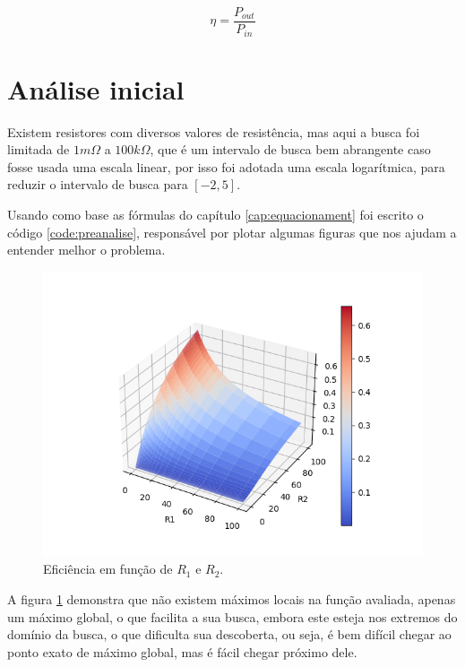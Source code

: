 \documentclass[12pt]{article}
\begin{document}
\begin{equation}
    \label{eq:n}
    \eta = \frac{P_{out}}{P_{in}}
\end{equation}

\section{Análise inicial}

Existem resistores com diversos valores de resistência, mas aqui a busca foi limitada de $1m\Omega$ a $100k\Omega$, que é um intervalo de busca bem abrangente caso fosse usada uma escala linear, por isso foi adotada uma escala logarítmica, para reduzir o intervalo de busca para $\left[-2,5\right]$.



Usando como base as fórmulas do capítulo \ref{cap:equacionament} foi escrito o código \ref{code:preanalise}, responsável por plotar algumas figuras que nos ajudam a entender melhor o problema.

\begin{figure}
    \centering
    \includegraphics{fig/surface.png}
    \caption{Eficiência em função de $R_1$ e $R_2$.}
    \label{fig:ef}
\end{figure}

A figura \ref{fig:ef} demonstra que não existem máximos locais na função avaliada, apenas um máximo global, o que facilita a sua busca, embora este esteja nos extremos do domínio da busca, o que dificulta sua descoberta, ou seja, é bem difícil chegar ao ponto exato de máximo global, mas é fácil chegar próximo dele.
\end{document}
